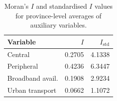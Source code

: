 \documentclass[openany]{book}
\begin{document}
\begin{table}[ht]
\centering
\begin{tabular}{lrr}
Variable & $I$ & $I_\mathrm{std}$  \\ \hline
Central & 0.2705 & 4.1338   \\  
Peripheral & 0.4236 & 6.3447   \\
Broadband avail. & 0.1908 & 2.9234 \\ 
Urban transport & 0.0662 & 1.1072  \\  
\hline
\end{tabular}
\caption{Moran's $I$ and standardised $I$ values for province-level averages of auxiliary variables.}
\label{tab:MoranProv}
\end{table}





\end{document}
